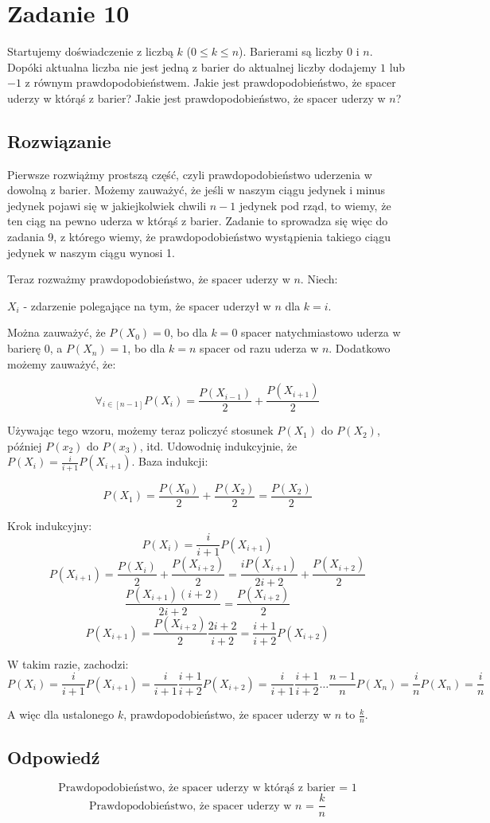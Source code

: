 \section{Zadanie 10}

Startujemy doświadczenie z liczbą \(k\) (\(0 \leq k \leq n\)). Barierami są liczby \(0\) i \(n\). Dopóki aktualna liczba nie jest jedną z barier do aktualnej liczby dodajemy \(1\) lub \(-1\) z równym prawdopodobieństwem. Jakie jest prawdopodobieństwo, że spacer uderzy w którąś z barier? Jakie jest prawdopodobieństwo, że spacer uderzy w \(n\)?

\subsection*{Rozwiązanie}
Pierwsze rozwiążmy prostszą część, czyli prawdopodobieństwo uderzenia w dowolną z barier. Możemy zauważyć, że jeśli w naszym ciągu jedynek i minus jedynek pojawi się w jakiejkolwiek chwili \(n - 1\) jedynek pod rząd, to wiemy, że ten ciąg na pewno uderza w którąś z barier. Zadanie to sprowadza się więc do zadania 9, z którego wiemy, że prawdopodobieństwo wystąpienia takiego ciągu jedynek w naszym ciągu wynosi 1.

Teraz rozważmy prawdopodobieństwo, że spacer uderzy w \(n\). Niech:

\(X_i\) - zdarzenie polegające na tym, że spacer uderzył w \(n\) dla \(k = i\).

Można zauważyć, że \(P(X_0) = 0\), bo dla \(k = 0\) spacer natychmiastowo uderza w barierę \(0\), a \(P(X_n) = 1\), bo dla \(k = n\) spacer od razu uderza w \(n\). Dodatkowo możemy zauważyć, że:

\[ \forall_{i \in [n-1]} P(X_i) = \frac{P(X_{i-1})}{2} + \frac{P(X_{i+1})}{2} \]

Używając tego wzoru, możemy teraz policzyć stosunek \(P(X_1)\) do \(P(X_2)\), później \(P(x_2)\) do \(P(x_3)\), itd. Udowodnię indukcyjnie, że \(P(X_i) = \frac{i}{i+1} P(X_{i+1})\). Baza indukcji:

\[ P(X_1) = \frac{P(X_{0})}{2} + \frac{P(X_{2})}{2} = \frac{P(X_{2})}{2} \]

Krok indukcyjny:
\[ P(X_i) = \frac{i}{i+1} P(X_{i+1}) \]
\[ P(X_{i+1}) = \frac{P(X_{i})}{2} + \frac{P(X_{i+2})}{2} = \frac{iP(X_{i+1})}{2i +2} + \frac{P(X_{i+2})}{2}\]
\[ \frac{P(X_{i+1})(i+2)}{2i+2} = \frac{P(X_{i+2})}{2} \]
\[ P(X_{i+1}) = \frac{P(X_{i+2})}{2} \frac{2i+2}{i+2} = \frac{i+1}{i+2} P(X_{i+2}) \]

W takim razie, zachodzi:
\[ P(X_i) = \frac{i}{i+1} P(X_{i+1}) = \frac{i}{i+1}\frac{i+1}{i+2} P(X_{i+2}) = \frac{i}{i+1} \frac{i+1}{i+2} \ldots \frac{n-1}{n} P(X_n) = \frac{i}{n} P(X_n) = \frac{i}{n}  \]

A więc dla ustalonego \(k\), prawdopodobieństwo, że spacer uderzy w \(n\) to \(\frac{k}{n}\).

\subsection*{Odpowiedź}
\[
	\boxed{\text{Prawdopodobieństwo, że spacer uderzy w którąś z barier = 1}}
\]
\[
	\boxed{\text{Prawdopodobieństwo, że spacer uderzy w \(n\) = \(\frac{k}{n}\)}}
\]
